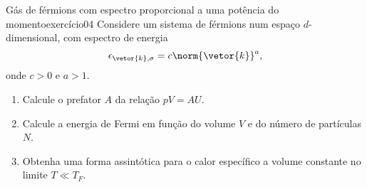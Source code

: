\begin{exercício}{Gás de férmions com espectro proporcional a uma potência do momento}{exercício04}
    Considere um sistema de férmions num espaço \(d\)-dimensional, com espectro de energia
    \begin{equation*}
        \epsilon_{\vetor{k}, \sigma} = c \norm{\vetor{k}}^a,
    \end{equation*}
    onde \(c > 0\) e \(a > 1\).
    \begin{enumerate}[label=(\alph*)]
        \item Calcule o prefator \(A\) da relação \(pV = AU\).
        \item Calcule a energia de Fermi em função do volume \(V\) e do número de partículas \(N\).
        \item Obtenha uma forma assintótica para o calor específico a volume constante no limite \(T \ll T_F\).
    \end{enumerate}
\end{exercício}

